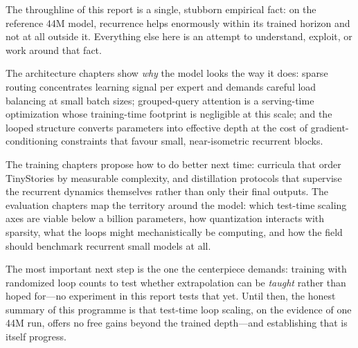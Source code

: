 The throughline of this report is a single, stubborn empirical fact:
on the reference 44M model, recurrence helps enormously within its
trained horizon and not at all outside it. Everything else here is an
attempt to understand, exploit, or work around that fact.

The architecture chapters show \emph{why} the model looks the way it
does: sparse routing concentrates learning signal per expert and
demands careful load balancing at small batch sizes; grouped-query
attention is a serving-time optimization whose training-time footprint
is negligible at this scale; and the looped structure converts
parameters into effective depth at the cost of gradient-conditioning
constraints that favour small, near-isometric recurrent blocks.

The training chapters propose how to do better next time: curricula
that order TinyStories by measurable complexity, and distillation
protocols that supervise the recurrent dynamics themselves rather than
only their final outputs. The evaluation chapters map the territory
around the model: which test-time scaling axes are viable below a
billion parameters, how quantization interacts with sparsity, what the
loops might mechanistically be computing, and how the field should
benchmark recurrent small models at all.

The most important next step is the one the centerpiece demands:
training with randomized loop counts to test whether extrapolation can
be \emph{taught} rather than hoped for---no experiment in this report
tests that yet. Until then, the honest summary of this programme is
that test-time loop scaling, on the evidence of one 44M run, offers no
free gains beyond the trained depth---and establishing that is itself
progress.
